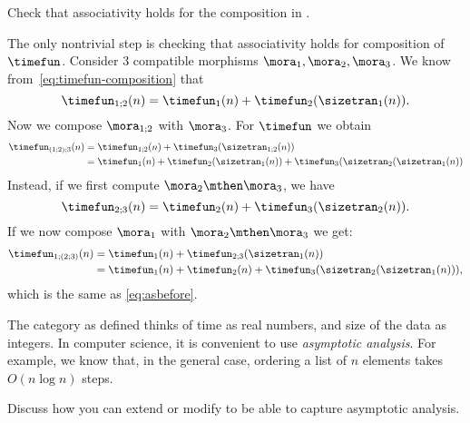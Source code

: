 \begin{exercise}
    Check that associativity holds for the composition in \ProcSizeTime.
\end{exercise}
\begin{solution}
    The only nontrivial step is checking that associativity holds for composition of~$\timefun$.
    Consider 3 compatible morphisms $\mora_1,\mora_2,\mora_3$.
    We know from~\cref{eq:timefun-composition} that
    \begin{equation}
        \timefun_{1;2} (n) = \timefun_1(n) + \timefun_2(\sizetran_1(n)).
    \end{equation}
    Now we compose $\mora_{1;2}$ with $\mora_3$.
    For $\timefun$ we obtain
    \begin{align}
        \timefun_{(1;2);3}(n) & =  \timefun_{1;2}(n) + \timefun_3(\sizetran_{1;2}(n)) \\
                              & =  \timefun_1(n)
        + \timefun_2(\sizetran_1(n))
        + \timefun_3(\sizetran_2(\sizetran_1(n)) \label{eq:asbefore}
    \end{align}
    Instead, if we first compute $\mora_2\mthen\mora_3$, we have
    \begin{equation}
        \timefun_{2;3} (n) = \timefun_2(n) + \timefun_3(\sizetran_2(n)).
    \end{equation}
    If we now compose $\mora_1$ with $\mora_2\mthen\mora_3$ we get:
    \begin{align}
        \timefun_{1;(2;3)} (n) & = \timefun_1(n) + \timefun_{2;3}(\sizetran_1(n)) \\
                               & = \timefun_1(n) + \timefun_2(n) + \timefun_3(\sizetran_2(\sizetran_1(n))),
    \end{align}
    which is the same as \cref{eq:asbefore}.
\end{solution}


\vfill
\begin{gradedexercise}
    The category \ProcSizeTime as defined thinks of time as real numbers, and size of the data as integers.
    In computer science, it is convenient to use \emph{asymptotic analysis}.
    For example, we know that, in the general case, ordering a list of $n$ elements takes $O(n \log n)$ steps.

    Discuss how you can extend or modify \ProcSizeTime to be able to capture asymptotic analysis.
\end{gradedexercise}



